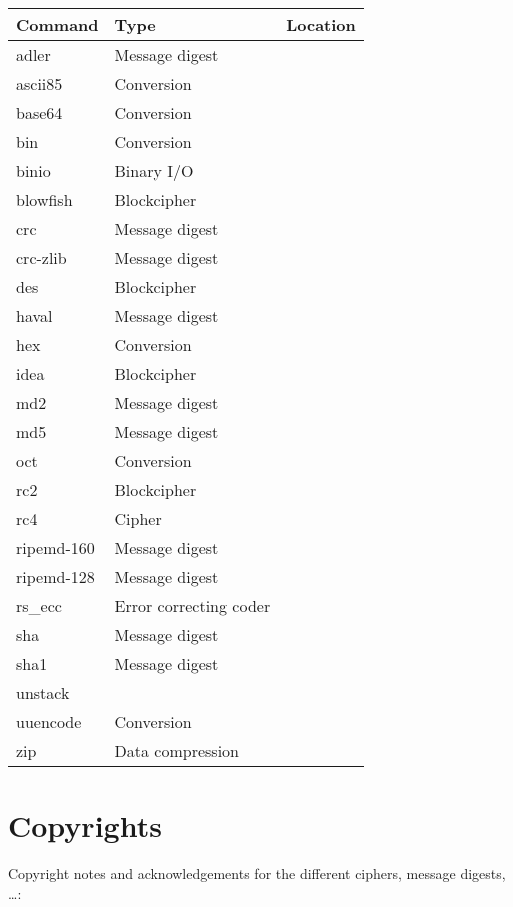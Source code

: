 \documentclass {report}
\begin{document}
\begin {tabular}{|l|l|l|}\hline
	Command		& Type				& Location \\ \hline\hline
	adler		& Message digest		& \zlib	\\ \hline
	ascii85		& Conversion			& \trf	\\ \hline
	base64		& Conversion			& \trf	\\ \hline
	bin		& Conversion			& \trf	\\ \hline
	binio		& Binary I/O			& \trf	\\ \hline
	blowfish	& Blockcipher			& \trf	\\ \hline
	crc		& Message digest		& \trf	\\ \hline
	crc-zlib	& Message digest		& \zlib	\\ \hline
	des		& Blockcipher			& \SSLeay \\ \hline
	haval		& Message digest		& \trf	\\ \hline
	hex		& Conversion			& \trf	\\ \hline
	idea		& Blockcipher			& \trf	\\ \hline
	md2		& Message digest		& \SSLeay \\ \hline
	md5		& Message digest		& \trf	\\ \hline
	oct		& Conversion			& \trf	\\ \hline
	rc2		& Blockcipher			& \SSLeay \\ \hline
	rc4		& Cipher			& \trf	\\ \hline
	ripemd-160	& Message digest		& \trf	\\ \hline
	ripemd-128	& Message digest		& \trf	\\ \hline
	rs\_ecc		& Error correcting coder	& \trf	\\ \hline
	sha		& Message digest		& \trf	\\ \hline
	sha1		& Message digest		& \SSLeay \\ \hline
	unstack		&				& \trf	\\ \hline
	uuencode	& Conversion			& \trf	\\ \hline
	zip		& Data compression		& \zlib	\\ \hline
\end {tabular}


\chapter {Copyrights}\label {copyright}

Copyright notes and acknowledgements for the different ciphers,
message digests, \dots {}:
\end{document}
